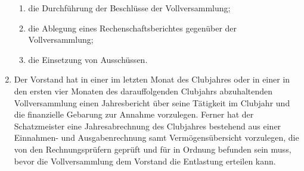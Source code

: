 \documentclass{article}
\begin{document}
\begin{enumerate}
\begin{enumerate}
        \item die Durchführung der Beschlüsse der Vollversammlung;
        \item die Ablegung eines Rechenschaftsberichtes gegenüber der Vollversammlung;
        \item die Einsetzung von Ausschüssen.
    \end{enumerate}
    \item Der Vorstand hat in einer im letzten Monat des Clubjahres oder in einer in den ersten vier Monaten des darauffolgenden Clubjahrs abzuhaltenden Vollversammlung einen Jahresbericht über seine Tätigkeit im Clubjahr und die finanzielle Gebarung zur Annahme vorzulegen. Ferner hat der Schatzmeister eine Jahresabrechnung des Clubjahres bestehend aus einer Einnahmen- und Ausgabenrechnung samt Vermögensübersicht vorzulegen, die von den Rechnungsprüfern geprüft und für in Ordnung befunden sein muss, bevor die Vollversammlung dem Vorstand die Entlastung erteilen kann. 
\end{enumerate}
\end{document}
